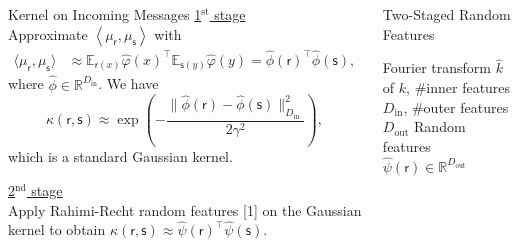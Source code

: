 \documentclass[english]{beamer}
\begin{document}
\begin{frame}
\begin{columns}[t]
\begin{block}{Kernel on Incoming Messages}
\vspace*{5mm}
%
\underline{1$^{\text{st}}$ stage } \vspace{5mm} \\ 
Approximate $\left\langle
\mu_{\mathsf{r}},\mu_{\mathsf{s}}\right\rangle$  with 
%
\begin{align*}
 \langle \mu_{\mathsf{r}},\mu_{\mathsf{s}}  \rangle
 & \approx 
  \mathbb{E}_{\mathsf{r}(x)} 
   \hat{\varphi}(x)^\top \mathbb{E}_{\mathsf{s}(y)}  \hat{\varphi}(y) 
 = \hat{\phi}(\mathsf{r})^\top \hat{\phi}(\mathsf{s}),
\end{align*}
%
where $\hat{\phi} \in \mathbb{R}^{D_\mathrm{in}}$. We have 
%
\begin{equation*}
\kappa(\mathsf{r},
\mathsf{s})\approx\exp\left(-\frac{\|\hat{\phi}(\mathsf{r})-\hat{\phi}(\mathsf{s})\|_{D_\mathrm{in}}^{2}}{2\gamma^{2}}\right),
%
\end{equation*}
%
which is a standard Gaussian kernel. 


\vspace{10mm}
\underline{2$^{\text{nd}}$ stage } \vspace{5mm} \\ 
Apply Rahimi-Recht random features [1] on the Gaussian kernel to obtain 
$\kappa(\mathsf{r}, \mathsf{s}) \approx \hat{\psi}(\mathsf{r})^\top
\hat{\psi}(\mathsf{s})$.

\end{block}




\begin{block}{Two-Staged Random Features }
\begin{algorithmic}[1]
\REQUIRE 
Fourier transform $\hat{k}$ of $k$, \#inner features $D_\mathrm{in}$, \#outer features $D_\mathrm{out}$
\ENSURE Random features $\hat{\psi}(\mathsf{r}) \in \mathbb{R}^{D_\mathrm{out}}$


\end{algorithmic}
\end{block}
\end{columns}
\end{frame}
\end{document}
